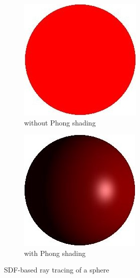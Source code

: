 \documentclass[10pt,a4paper,english, twocolumn]{article}
\begin{document}
\begin{figure}
    \begin{subfigure}{.5\linewidth}
        \centering
        \includegraphics[width=.9\linewidth]{figures/ray_marching.JPG}
        \caption{without Phong shading}
        \label{sfig:sphere-tracing1}
    \end{subfigure}%
    \begin{subfigure}{.5\linewidth}
        \centering
        \includegraphics[width=.9\linewidth]{figures/ray_marching_phong.JPG}
        \caption{with Phong shading}
        \label{sfig:sphere-tracing2}
    \end{subfigure}
    \caption{SDF-based ray tracing of a sphere}
    \label{fig:sphere-tracing}
\end{figure}
\end{document}
